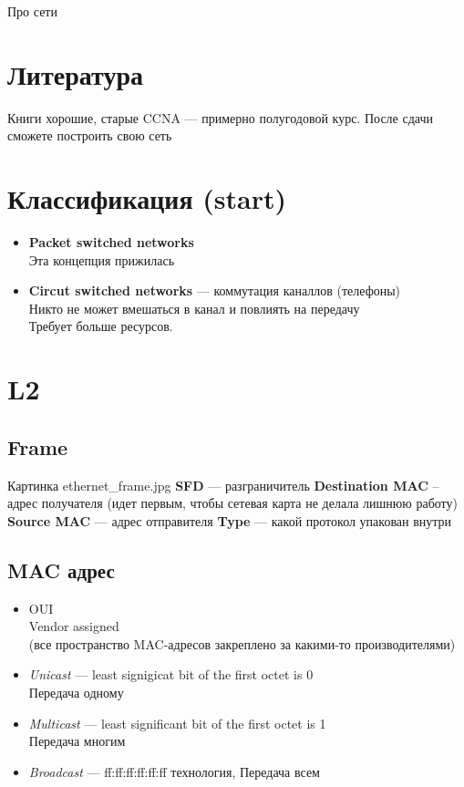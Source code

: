 Про сети

\section{Литература}
Книги хорошие, старые
CCNA --- примерно полугодовой курс. После сдачи сможете построить свою сеть

\section{Классификация (start)}
\begin{itemize} \item \textbf{Packet switched networks}\\ Эта концепция прижилась
    \item \textbf{Circut switched networks} --- коммутация каналлов (телефоны)\\
          Никто не может вмешаться в канал и повлиять на передачу\\
          Требует больше ресурсов.
\end{itemize}

\section{L2}
\subsection{Frame}
Картинка ethernet\_frame.jpg
\textbf{SFD} --- разграничитель
\textbf{Destination MAC} -- адрес получателя (идет первым, чтобы сетевая карта не делала лишнюю работу)
\textbf{Source MAC} --- адрес отправителя
\textbf{Type} --- какой протокол упакован внутри

\subsection{MAC адрес}
\begin{itemize}
    \item OUI\\
          Vendor assigned\\
          (все пространство MAC-адресов закреплено за какими-то производителями)
    \item \emph{Unicast} --- least signigicat bit of the first octet is 0\\
          Передача одному
    \item \emph{Multicast} --- least significant bit of the first octet is 1\\
          Передача многим
    \item \emph{Broadcast} --- ff:ff:ff:ff:ff:ff технология, 
          Передача всем \end{itemize} 
